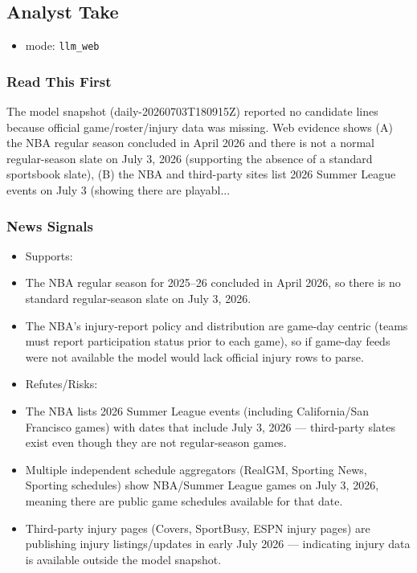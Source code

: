 \documentclass[10pt]{article}
\begin{document}
\newpage

\subsection*{Analyst Take}

\begin{itemize}
\item mode: \texttt{llm\_web}
\end{itemize}

\subsubsection*{Read This First}

The model snapshot (daily-20260703T180915Z) reported no candidate lines because official game/roster/injury data was missing. Web evidence shows (A) the NBA regular season concluded in April 2026 and there is not a normal regular-season slate on July 3, 2026 (supporting the absence of a standard sportsbook slate), (B) the NBA and third-party sites list 2026 Summer League events on July 3 (showing there are playabl...

\subsubsection*{News Signals}

\begin{itemize}
\item Supports:
\item [S1] The NBA regular season for 2025–26 concluded in April 2026, so there is no standard regular-season slate on July 3, 2026.
\item [S2] The NBA’s injury-report policy and distribution are game-day centric (teams must report participation status prior to each game), so if game-day feeds were not available the model would lack official injury rows to parse.
\item Refutes/Risks:
\item [S3] The NBA lists 2026 Summer League events (including California/San Francisco games) with dates that include July 3, 2026 — third-party slates exist even though they are not regular-season games.
\item [S4] Multiple independent schedule aggregators (RealGM, Sporting News, Sporting schedules) show NBA/Summer League games on July 3, 2026, meaning there are public game schedules available for that date.
\item [S5] Third-party injury pages (Covers, SportBusy, ESPN injury pages) are publishing injury listings/updates in early July 2026 — indicating injury data is available outside the model snapshot.
\end{itemize}
\end{document}
